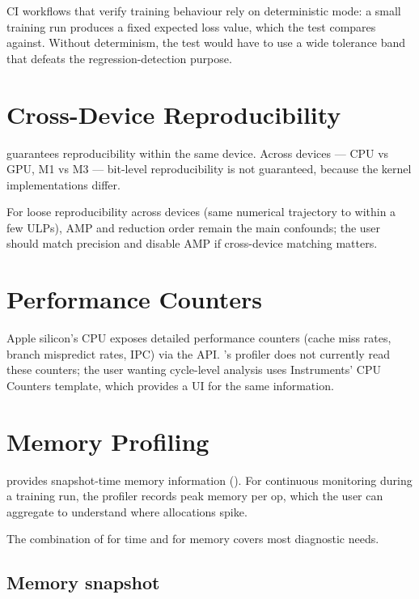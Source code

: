 CI workflows that verify training behaviour rely on
deterministic mode: a small training run produces a fixed
expected loss value, which the test compares against. Without
determinism, the test would have to use a wide tolerance band
that defeats the regression-detection purpose.

\section{Cross-Device Reproducibility}
\label{sec:profiler_determinism:cross_device}

 guarantees reproducibility within the
same device. Across devices --- CPU vs GPU, M1 vs M3 --- bit-level
reproducibility is not guaranteed, because the kernel
implementations differ.

For loose reproducibility across devices (same numerical
trajectory to within a few ULPs), AMP and reduction order
remain the main confounds; the user should match precision and
disable AMP if cross-device matching matters.

\section{Performance Counters}
\label{sec:profiler_determinism:perf_counters}

Apple silicon's CPU exposes detailed performance counters (cache
miss rates, branch mispredict rates, IPC) via the 
API. \Lucid's profiler does not currently read these counters;
the user wanting cycle-level analysis uses Instruments'
CPU Counters template, which provides a UI for the same
information.

\section{Memory Profiling}
\label{sec:profiler_determinism:memory_profile}

 provides snapshot-time memory
information (). For continuous monitoring
during a training run, the profiler records peak memory per op,
which the user can aggregate to understand where allocations
spike.

The combination of  for time and
 for memory covers most diagnostic needs.

\subsection{Memory snapshot}
\label{ssec:profiler_determinism:memory_snapshot}


